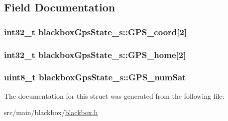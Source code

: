 \subsection{Field Documentation}
\hypertarget{structblackboxGpsState__s_a6af2131bfa30f5681b191f0b7dce37fe}{
\subsubsection[{G\+P\+S\+\_\+coord}]{\setlength{\rightskip}{0pt plus 5cm}int32\+\_\+t blackbox\+Gps\+State\+\_\+s\+::\+G\+P\+S\+\_\+coord\mbox{[}2\mbox{]}}}\label{structblackboxGpsState__s_a6af2131bfa30f5681b191f0b7dce37fe}
\hypertarget{structblackboxGpsState__s_a3b7943c2236ac2b26a14b0c7f83dd998}{
\subsubsection[{G\+P\+S\+\_\+home}]{\setlength{\rightskip}{0pt plus 5cm}int32\+\_\+t blackbox\+Gps\+State\+\_\+s\+::\+G\+P\+S\+\_\+home\mbox{[}2\mbox{]}}}\label{structblackboxGpsState__s_a3b7943c2236ac2b26a14b0c7f83dd998}
\hypertarget{structblackboxGpsState__s_a644bd9860f4f3b4d1e2f4f80ff224559}{
\subsubsection[{G\+P\+S\+\_\+num\+Sat}]{\setlength{\rightskip}{0pt plus 5cm}uint8\+\_\+t blackbox\+Gps\+State\+\_\+s\+::\+G\+P\+S\+\_\+num\+Sat}}\label{structblackboxGpsState__s_a644bd9860f4f3b4d1e2f4f80ff224559}


The documentation for this struct was generated from the following file\+:\begin{DoxyCompactItemize}
\item 
src/main/blackbox/\hyperlink{blackbox_2blackbox_8h}{blackbox.\+h}\end{DoxyCompactItemize}
